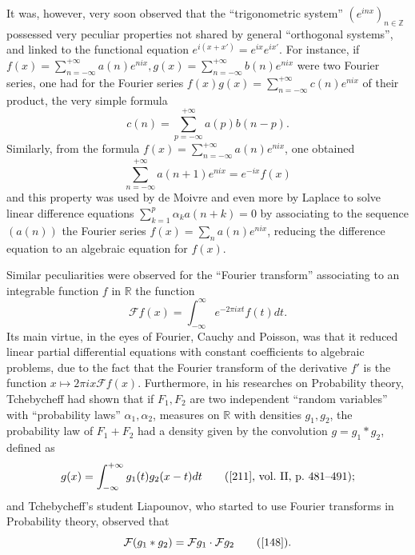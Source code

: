 \documentclass[12pt,a4paper,leqno,twoside]{extbook}
\newcommand{\R}{\mathbb{R}}
\begin{document}
It was, however, very soon observed that the ``trigonometric system'' \((e^{inx})_{n \in \mathbb{Z}}\) possessed very peculiar properties not shared by general ``orthogonal systems'', and linked to the functional equation \(e^{i(x + x')} = e^{ix} e^{ix'}\). For instance, if \(f(x) = \sum\limits_{n=-\infty}^{+\infty} a(n) e^{nix}, g(x) = \sum\limits_{n=-\infty}^{+\infty} b(n) e^{nix}\) were two Fourier series, one had for the Fourier series \(f(x)g(x) = \sum\limits_{n=-\infty}^{+\infty} c(n)e^{nix}\) of their product, the very simple formula
\begin{equation}
    \label{eq:7.40}
    c(n) = \sum_{p=-\infty}^{+\infty} a(p)b(n-p).
\end{equation}
Similarly, from the formula \(f(x) = \sum\limits_{n=-\infty}^{+\infty} a(n) e^{nix}\), one obtained
\begin{equation}
    \label{eq:7.41}
    \sum_{n=-\infty}^{+\infty} a(n+1) e^{nix} = e^{-ix}f(x)
\end{equation}
and this property was used by de Moivre and even more by Laplace to solve linear difference equations \(\sum\limits_{k=1}^p \alpha_k a(n+k) = 0\) by associating to the sequence \((a(n))\) the Fourier series \(f(x) = \sum\limits_{n} a(n) e^{nix}\), reducing the difference equation to an algebraic equation for \(f(x)\).

Similar peculiarities were observed for the ``Fourier transform'' associating to an integrable function \(f\) in \(\R\) the function
\begin{equation}
    \label{eq:7.42}
    \mathcal{F}f(x) = \int_{-\infty}^{\infty} e^{-2\pi ixt} f(t)dt.
\end{equation}
Its main virtue, in the eyes of Fourier, Cauchy and Poisson, was that it reduced linear partial differential equations with constant coefficients to algebraic problems, due to the fact that the Fourier transform of the derivative \(f'\) is the function \( x\mapsto 2\pi ix \mathcal{F}f(x)\). Furthermore, in his researches on Probability theory, Tchebycheff had shown that if \(F_1, F_2\) are two independent ``random variables'' with ``probability laws'' \(\alpha_1, \alpha_2\), measures on \(\R\) with densities \(g_1, g_2\), the probability law of \(F_1 + F_2\) had a density given by the convolution \(g = g_1 * g_2\), defined as
\begin{equation}
    \label{eq:7.43}
    g(x) = \int_{-\infty}^{+\infty} g_1(t) g_2(x - t)dt
    \qquad
    (\text{\cite{211}, vol.~II, p.~481--491});
\end{equation}
and Tchebycheff's student Liapounov, who started to use Fourier transforms in Probability theory, observed that
\begin{equation}
    \label{eq:7.44}
    \mathcal{F}(g_1 * g_2) = \mathcal{F}g_1 \cdot \mathcal{F}g_2
    \qquad
    (\text{\cite{148}}).
\end{equation}
\end{document}
